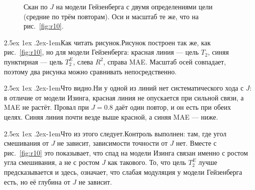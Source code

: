 \documentclass[12pt,a4paper]{report}
\makeatletter
\renewcommand\paragraph{\@startsection{paragraph}{4}{\z@}%
  {2.5ex \@plus1ex \@minus.2ex}{-1em}{\normalfont\normalsize\bfseries}}
\numberwithin{equation}{chapter}
\newcommand{\figread}{\paragraph{Как читать рисунок.}}
\newcommand{\figsee}{\paragraph{Что видно.}}
\newcommand{\figgen}{\paragraph{Что из этого следует.}}
\makeatother
\begin{document}
\begin{figure}[h]
\centering
{}\hfill
{}
\caption{Скан по $J$ на модели Гейзенберга с двумя определениями цели
(средние по трём повторам). Оси и масштаб те же, что на
рис.~\ref{fig:r10}.}
\label{fig:r20}
\end{figure}

\figread Рисунок построен так же, как рис.~\ref{fig:r10}, но для модели
Гейзенберга: красная линия --- цель $T_2$, синяя пунктирная --- цель $T_2^E$,
слева $R^2$, справа MAE. Масштаб осей совпадает, поэтому два рисунка можно
сравнивать непосредственно.

\figsee Ни у одной из линий нет систематического хода с $J$: в отличие от
модели Изинга, красная линия не опускается при сильной связи, а MAE не
растёт. Провал при $J=0.8$ даёт один повтор, и он есть при обеих целях.
Синяя линия почти везде выше красной, а синяя MAE --- ниже.

\figgen Контроль выполнен: там, где угол смешивания от $J$ не зависит,
зависимости точности от $J$ нет. Вместе с рис.~\ref{fig:r10} это
показывает, что спад на модели Изинга связан именно с ростом угла
смешивания, а не с ростом $J$ как такового. То, что цель $T_2^E$ лучше
предсказывается и здесь, означает, что слабая модуляция у модели
Гейзенберга есть, но её глубина от $J$ не зависит.
\end{document}
